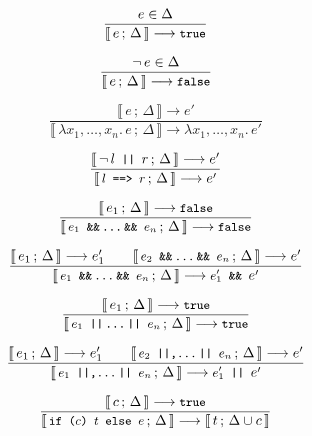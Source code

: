 \documentclass[a4paper,twoside]{article}
\newcommand{\lb}[2]{\llbracket\, #1\,;\, #2\, \rrbracket}
\newcommand{\stt}[1]{\texttt{\small{#1}}}
\begin{document}
\begin{figure}[htb]
\begin{framed}
 
\begin{equation}
\dfrac{
  e \in \Delta
}{
  \lb{e}{\Delta} \longrightarrow \stt{true}
}
\end{equation}

\begin{equation}
\dfrac{
  \neg\, e \in \Delta
}{
  \lb{e}{\Delta} \longrightarrow \stt{false}
}
\end{equation}

\begin{equation}
\dfrac{
  \lb{e}{\Delta} \longrightarrow e'
}{
  \lb{\lambda x_1, \ldots, x_n.\, e}{\Delta} \longrightarrow \lambda x_1, \ldots, x_n.\, e'
}
\end{equation}

\begin{equation}
\dfrac{
  \lb{\neg\,l \stt{ || } r}{\Delta} \longrightarrow e'
}{
  \lb{\stt{$l$ ==> $r$}}{\Delta} \longrightarrow e'
}
\end{equation}

\begin{equation}
\dfrac{
  \lb{e_1}{\Delta} \longrightarrow \stt{false}
}{
  \lb{\stt{$e_1$ \&\&\,\ldots\,\&\& $e_n$}}{\Delta} \longrightarrow \stt{false}
}
\end{equation}

\begin{equation}
\dfrac{
  \lb{e_1}{\Delta} \longrightarrow e_1' \qquad
  \lb{\stt{$e_2$ \&\&\,\ldots\,\&\& $e_n$}}{\Delta} \longrightarrow e'
}{
  \lb{\stt{$e_1$ \&\&\,\ldots\,\&\& $e_n$}}{\Delta} \longrightarrow \stt{$e_1'$ \&\& } e' 
}
\end{equation}

\begin{equation}
\dfrac{
  \lb{e_1}{\Delta} \longrightarrow \stt{true}
}{
  \lb{\stt{$e_1$ ||\,\ldots\,|| $e_n$}}{\Delta} \longrightarrow \stt{true}
}
\end{equation}

\begin{equation}
\dfrac{
  \lb{e_1}{\Delta} \longrightarrow e_1' \qquad
  \lb{\stt{$e_2$ ||,\ldots\,|| $e_n$}}{\Delta} \longrightarrow e'
}{
  \lb{\stt{$e_1$ ||,\ldots\,|| $e_n$}}{\Delta} \longrightarrow \stt{$e_1'$ || } e'
}
\end{equation}

\begin{equation}
\dfrac{
  \lb{c}{\Delta} \longrightarrow \stt{true}
}{
  \lb{\stt{if ($c$) $t$ else $e$}}{\Delta} \longrightarrow \lb{t}{\Delta \cup c}
}
\end{equation}


\end{framed}
\end{figure}
\end{document}
